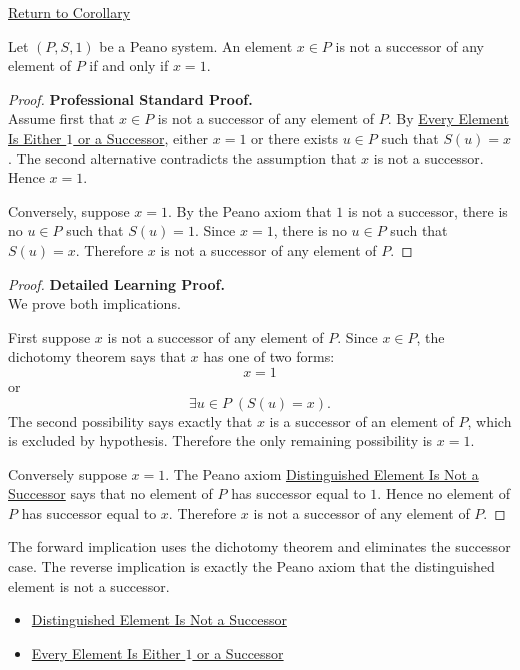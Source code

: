 \newpage
{}
\label{prf:one-is-unique-non-successor}

\begin{remark*}[Return]
\hyperref[cor:one-is-unique-non-successor]{Return to Corollary}
\end{remark*}

\begin{corollary*}
Let $(P,S,1)$ be a Peano system. An element $x \in P$ is not a successor of
any element of $P$ if and only if $x=1$.
\end{corollary*}

\begin{proof}
\textbf{Professional Standard Proof.}~\\
Assume first that $x\in P$ is not a successor of any element of $P$. By
\hyperref[thm:every-element-is-one-or-a-successor]{Every Element Is Either
$1$ or a Successor}, either $x=1$ or there exists $u\in P$ such that
$S(u)=x$. The second alternative contradicts the assumption that $x$ is not a
successor. Hence $x=1$.

Conversely, suppose $x=1$. By the Peano axiom that $1$ is not a successor,
there is no $u\in P$ such that $S(u)=1$. Since $x=1$, there is no $u\in P$
such that $S(u)=x$. Therefore $x$ is not a successor of any element of $P$.
\end{proof}

\begin{proof}
\textbf{Detailed Learning Proof.}~\\
We prove both implications.

First suppose $x$ is not a successor of any element of $P$. Since $x\in P$,
the dichotomy theorem says that $x$ has one of two forms:
\[
x=1
\]
or
\[
\exists u\in P\;(S(u)=x).
\]
The second possibility says exactly that $x$ is a successor of an element of
$P$, which is excluded by hypothesis. Therefore the only remaining
possibility is $x=1$.

Conversely suppose $x=1$. The Peano axiom
\hyperref[ax:peano-one-not-successor]{Distinguished Element Is Not a
Successor} says that no element of $P$ has successor equal to $1$. Hence no
element of $P$ has successor equal to $x$. Therefore $x$ is not a successor
of any element of $P$.
\end{proof}

\begin{remark*}
The forward implication uses the dichotomy theorem and eliminates the
successor case. The reverse implication is exactly the Peano axiom that the
distinguished element is not a successor.
\end{remark*}

\begin{dependencies}
\begin{itemize}
  \item \hyperref[ax:peano-one-not-successor]{Distinguished Element Is Not a Successor}
  \item \hyperref[thm:every-element-is-one-or-a-successor]{Every Element Is Either $1$ or a Successor}
\end{itemize}
\end{dependencies}

